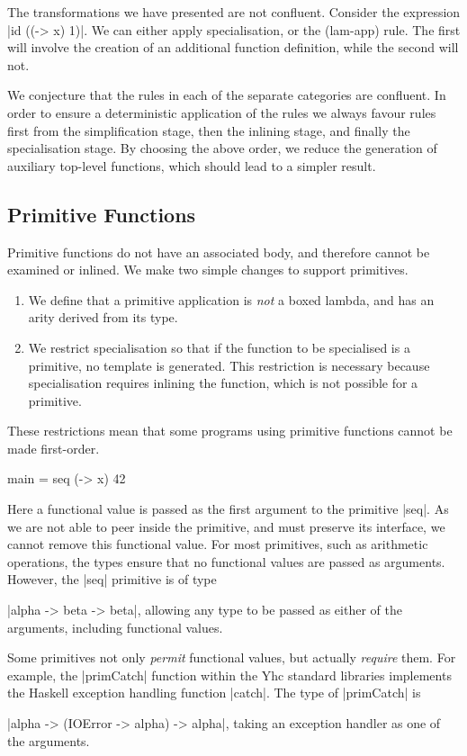 \documentclass{sigplanconf}
\begin{document}
The transformations we have presented are not confluent. Consider the expression |id ((\x -> x) 1)|. We can either apply specialisation, or the (lam-app) rule. The first will involve the creation of an additional function definition, while the second will not.

We conjecture that the rules in each of the separate categories are confluent. In order to ensure a deterministic application of the rules we always favour rules first from the simplification stage, then the inlining stage, and finally the specialisation stage. By choosing the above order, we reduce the generation of auxiliary top-level functions, which should lead to a simpler result.

\subsection{Primitive Functions}
\label{sec:primitives}

Primitive functions do not have an associated body, and therefore cannot be examined or inlined. We make two simple changes to support primitives.

\begin{enumerate}
\item We define that a primitive application is \textit{not} a boxed lambda, and has an arity derived from its type.
\item We restrict specialisation so that if the function to be specialised is a primitive, no template is generated. This restriction is necessary because specialisation requires inlining the function, which is not possible for a primitive.
\end{enumerate}

These restrictions mean that some programs using primitive functions cannot be made first-order.

\begin{example}
\begin{code}
main = seq (\x -> x) 42
\end{code}

Here a functional value is passed as the first argument to the primitive |seq|. As we are not able to peer inside the primitive, and must preserve its interface, we cannot remove this functional value. For most primitives, such as arithmetic operations, the types ensure that no functional values are passed as arguments. However, the |seq| primitive is of type \ignore|alpha -> beta -> beta|, allowing any type to be passed as either of the arguments, including functional values.

Some primitives not only \textit{permit} functional values, but actually \textit{require} them. For example, the |primCatch| function within the Yhc standard libraries implements the Haskell exception handling function |catch|. The type of |primCatch| is \ignore|alpha -> (IOError -> alpha) -> alpha|, taking an exception handler as one of the arguments.
\end{example}
\end{document}
